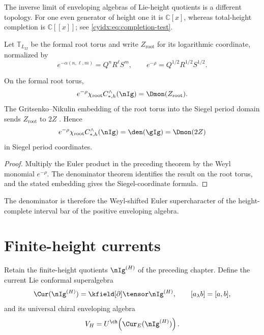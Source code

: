 The inverse limit of enveloping algebras of Lie-height
quotients is a different topology. For one even generator
of height one it is $\mathbb C[x]$, whereas total-height
completion is $\mathbb C[[x]]$; see
\eqref{cyidx:eq:completion-test}.

Let $\mathbb T_{L_{II}}$ be the formal root torus and write $Z_{\mathrm{root}}$ for its logarithmic coordinate, normalized by
\[
 e^{-\alpha(n,\ell,m)}=Q^nR^\ell S^m,
 \qquad
 e^{-\rho}=Q^{1/2}R^{1/2}S^{1/2}.
\]

\begin{corollary}
On the formal root torus,
\[
 e^{-\rho}\chi_{\mathrm{root}}
 C_{*,h}^\wedge(\nIg)
 =\Dmon(Z_{\mathrm{root}}).
\]
The Gritsenko--Nikulin embedding of the root torus into the Siegel period domain sends $Z_{\mathrm{root}}$ to $2Z$ \cite{GN97,GN98b}. Hence
\[
 e^{-\rho}\chi_{\mathrm{root}}
 C_{*,h}^\wedge(\nIg)
 =\den(\gIg)=\Dmon(2Z)
\]
in Siegel period coordinates.
\end{corollary}
\begin{proof}
Multiply the Euler product in the preceding theorem by the Weyl monomial $e^{-\rho}$.  The denominator theorem identifies the result on the root torus, and the stated embedding gives the Siegel-coordinate formula.
\end{proof}

The denominator is therefore the Weyl-shifted Euler supercharacter of the height-complete interval bar of the positive enveloping algebra.

\chapter{Finite-height currents}
Retain the finite-height quotients $\nIg^{(H)}$ of the preceding chapter.  Define the current Lie conformal superalgebra
\[
 \Cur(\nIg^{(H)})=\kfield[\partial]\tensor\nIg^{(H)},
 \qquad [a_\lambda b]=[a,b],
\]
and its universal chiral enveloping algebra
\[
 V_H=U^{\ch}\!\left(\Cur_E(\nIg^{(H)})\right).
\]

